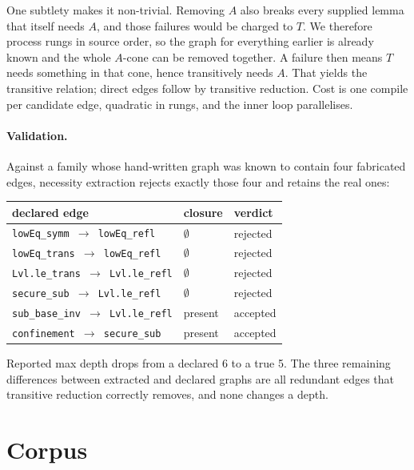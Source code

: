 \documentclass[10pt]{article}
\begin{document}
One subtlety makes it non-trivial. Removing $A$ also breaks every supplied lemma
that itself needs $A$, and those failures would be charged to $T$. We therefore
process rungs in source order, so the graph for everything earlier is already
known and the whole $A$-cone can be removed together. A failure then means $T$
needs something in that cone, hence transitively needs $A$. That yields the
transitive relation; direct edges follow by transitive reduction. Cost is one
compile per candidate edge, quadratic in rungs, and the inner loop parallelises.

\paragraph{Validation.} Against a family whose hand-written graph was known to
contain four fabricated edges, necessity extraction rejects exactly those four
and retains the real ones:

\begin{center}\small
\begin{tabular}{lll}
\toprule
declared edge & closure & verdict \\
\midrule
\texttt{lowEq\_symm $\to$ lowEq\_refl}   & $\emptyset$ & rejected \\
\texttt{lowEq\_trans $\to$ lowEq\_refl}  & $\emptyset$ & rejected \\
\texttt{Lvl.le\_trans $\to$ Lvl.le\_refl}& $\emptyset$ & rejected \\
\texttt{secure\_sub $\to$ Lvl.le\_refl}  & $\emptyset$ & rejected \\
\texttt{sub\_base\_inv $\to$ Lvl.le\_refl} & present & accepted \\
\texttt{confinement $\to$ secure\_sub}     & present & accepted \\
\bottomrule
\end{tabular}
\end{center}

Reported max depth drops from a declared 6 to a true 5. The three remaining
differences between extracted and declared graphs are all redundant edges that
transitive reduction correctly removes, and none changes a depth.

\section{Corpus}
\label{sec:corpus}
\end{document}
